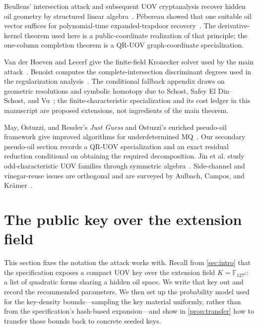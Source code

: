 \documentclass[10pt,a4paper]{article}
\newcommand{\F}{\mathbb F}
\begin{document}
Beullens' intersection attack and subsequent UOV cryptanalysis recover hidden oil geometry by structured linear algebra~\cite{Beullens}.  P\'ebereau showed that one suitable oil vector suffices for polynomial-time expanded-trapdoor recovery~\cite{Pebereau}.  The derivative-kernel theorem used here is a public-coordinate realization of that principle; the one-column completion theorem is a QR-UOV graph-coordinate specialization.

Van der Hoeven and Lecerf give the finite-field Kronecker solver used by the main attack~\cite{vdHL}.  Benoist computes the complete-intersection discriminant degrees used in the regularization analysis~\cite{Benoist}.  The conditional fallback appendix draws on geometric resolutions and symbolic homotopy due to Schost, Safey El Din--Schost, and Vu~\cite{Schost,SafeyElDinSchost,Vu}; the finite-characteristic specialization and its cost ledger in this manuscript are proposed extensions, not ingredients of the main theorem.

May, Ostuzzi, and Ressler's \emph{Just Guess} and Ostuzzi's enriched pseudo-oil framework give improved algorithms for underdetermined MQ~\cite{JustGuess,Ostuzzi}.  Our secondary pseudo-oil section records a QR-UOV specialization and an exact residual reduction conditional on obtaining the required decomposition.  Jin et al. study odd-characteristic UOV families through symmetric algebra~\cite{Jin}.  Side-channel and vinegar-reuse issues are orthogonal and are surveyed by Aulbach, Campos, and Kr\"amer~\cite{Aulbach}.

\section{The public key over the extension field}\label{sec:model}

This section fixes the notation the attack works with. Recall from \cref{sec:intro} that the specification exposes a compact UOV key over the extension field $K=\F_{127^3}$: a list of quadratic forms sharing a hidden oil space. We write that key out and record the recommended parameters. We then set up the probability model used for the key-density bounds---sampling the key material uniformly, rather than from the specification's hash-based expansion---and show in \cref{prop:transfer} how to transfer those bounds back to concrete seeded keys.
\end{document}
